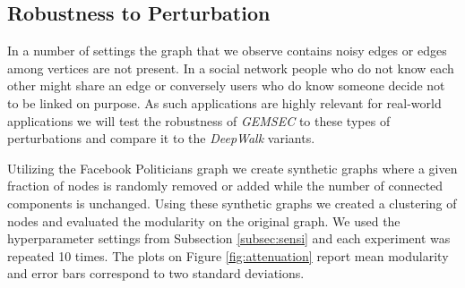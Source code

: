 \subsection{Robustness to Perturbation}
In a number of settings the graph that we observe contains noisy edges or edges among vertices are not present. In a social network people who do not know each other might share an edge or conversely users who do know someone decide not to be linked on purpose. As such applications are highly relevant for real-world applications we will test the robustness of \textit{GEMSEC} to these types of perturbations and compare it to the \textit{DeepWalk} variants. 

Utilizing the Facebook Politicians graph we create synthetic graphs where a given fraction of nodes is randomly removed or added while the number of connected components is unchanged. Using these synthetic graphs we created a clustering of nodes and evaluated the modularity on the original graph. We used the hyperparameter settings from Subsection \ref{subsec:sensi} and each experiment was repeated 10 times. The plots on Figure \ref{fig:attenuation} report mean modularity and error bars correspond to two standard deviations.
